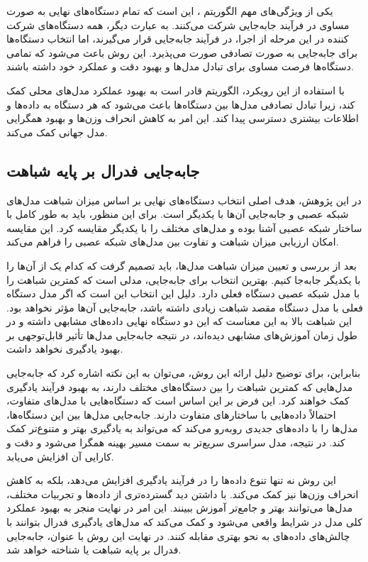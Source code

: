 یکی از ویژگی‌های مهم الگوریتم
%
، این است که تمام دستگاه‌های نهایی به صورت مساوی در فرآیند جابه‌جایی شرکت می‌کنند. به عبارت دیگر، همه دستگاه‌های شرکت کننده در این مرحله از اجرا، در فرآیند جابه‌جایی قرار می‌گیرند، اما انتخاب دستگاه‌ها برای جابه‌جایی به صورت تصادفی صورت می‌پذیرد. این روش باعث می‌شود که تمامی دستگاه‌ها فرصت مساوی برای تبادل مدل‌ها و بهبود دقت و عملکرد خود داشته باشند.

با استفاده از این رویکرد، الگوریتم
قادر است به بهبود عملکرد مدل‌های محلی کمک کند، زیرا تبادل تصادفی مدل‌ها بین دستگاه‌ها باعث می‌شود که هر دستگاه به داده‌ها و اطلاعات بیشتری دسترسی پیدا کند. این امر به کاهش انحراف وزن‌ها و بهبود همگرایی مدل جهانی کمک می‌کند.


\subsection{
جابه‌جایی فدرال بر پایه شباهت%
}
در این پژوهش، هدف اصلی انتخاب دستگاه‌های نهایی بر اساس میزان شباهت مدل‌های شبکه عصبی و جابه‌جایی آن‌ها با یکدیگر است. برای این منظور، باید به طور کامل با ساختار شبکه عصبی آشنا بوده و مدل‌های مختلف را با یکدیگر مقایسه کرد. این مقایسه امکان ارزیابی میزان شباهت و تفاوت بین مدل‌های شبکه عصبی را فراهم می‌کند.

بعد از بررسی و تعیین میزان شباهت مدل‌ها، باید تصمیم گرفت که کدام یک از آن‌ها را با یکدیگر جابه‌جا کنیم. بهترین انتخاب برای جابه‌جایی، مدلی است که کمترین شباهت را با مدل شبکه عصبی دستگاه فعلی دارد. دلیل این انتخاب این است که اگر مدل دستگاه فعلی با مدل دستگاه مقصد شباهت زیادی داشته باشد، جابه‌جایی آن‌ها مؤثر نخواهد بود. این شباهت بالا به این معناست که این دو دستگاه نهایی داده‌های مشابهی داشته و در طول زمان آموزش‌های مشابهی دیده‌اند، در نتیجه جابه‌جایی مدل‌ها تأثیر قابل‌توجهی بر بهبود یادگیری نخواهد داشت.

بنابراین، برای توضیح دلیل ارائه این روش، می‌توان به این نکته اشاره کرد که جابه‌جایی مدل‌هایی که کمترین شباهت را بین دستگاه‌های مختلف دارند، به بهبود فرآیند یادگیری کمک خواهند کرد. این فرض بر این اساس است که دستگاه‌هایی با مدل‌های متفاوت، احتمالاً داده‌هایی با ساختارهای متفاوت دارند. جابه‌جایی مدل‌ها بین این دستگاه‌ها، مدل‌ها را با داده‌های جدیدی روبه‌رو می‌کند که می‌تواند به یادگیری بهتر و متنوع‌تر کمک کند. در نتیجه، مدل سراسری سریع‌تر به سمت مسیر بهینه همگرا می‌شود و دقت و کارایی آن افزایش می‌یابد.

این روش نه تنها تنوع داده‌ها را در فرآیند یادگیری افزایش می‌دهد، بلکه به کاهش انحراف وزن‌ها نیز کمک می‌کند. با داشتن دید گسترده‌تری از داده‌ها و تجربیات مختلف، مدل‌ها می‌توانند بهتر و جامع‌تر آموزش ببینند. این امر در نهایت منجر به بهبود عملکرد کلی مدل در شرایط واقعی می‌شود و کمک می‌کند که مدل‌های یادگیری فدرال بتوانند با چالش‌های داده‌های
به نحو بهتری مقابله کنند.
در نهایت این روش با عنوان، جابه‌جایی فدرال بر پایه شباهت یا 
شناخته خواهد شد.

